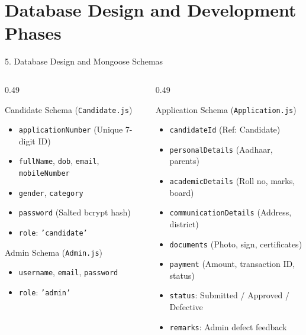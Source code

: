 \documentclass[aspectratio=169, 10pt]{beamer}
\begin{document}
\section{Database Design and Development Phases}

\begin{frame}{5. Database Design and Mongoose Schemas}
  \footnotesize
  \begin{columns}[T,onlytextwidth]
    \begin{column}{0.49\textwidth}
      \begin{block}{Candidate Schema (\texttt{Candidate.js})}
        \begin{itemize}
          \item \texttt{applicationNumber} (Unique 7-digit ID)
          \item \texttt{fullName}, \texttt{dob}, \texttt{email}, \texttt{mobileNumber}
          \item \texttt{gender}, \texttt{category}
          \item \texttt{password} (Salted bcrypt hash)
          \item \texttt{role}: \texttt{'candidate'}
        \end{itemize}
      \end{block}
      \begin{block}{Admin Schema (\texttt{Admin.js})}
        \begin{itemize}
          \item \texttt{username}, \texttt{email}, \texttt{password}
          \item \texttt{role}: \texttt{'admin'}
        \end{itemize}
      \end{block}
    \end{column}
    \begin{column}{0.49\textwidth}
      \begin{block}{Application Schema (\texttt{Application.js})}
        \begin{itemize}
          \item \texttt{candidateId} (Ref: Candidate)
          \item \texttt{personalDetails} (Aadhaar, parents)
          \item \texttt{academicDetails} (Roll no, marks, board)
          \item \texttt{communicationDetails} (Address, district)
          \item \texttt{documents} (Photo, sign, certificates)
          \item \texttt{payment} (Amount, transaction ID, status)
          \item \texttt{status}: Submitted / Approved / Defective
          \item \texttt{remarks}: Admin defect feedback
        \end{itemize}
      \end{block}
    \end{column}
  \end{columns}
\end{frame}
\end{document}
